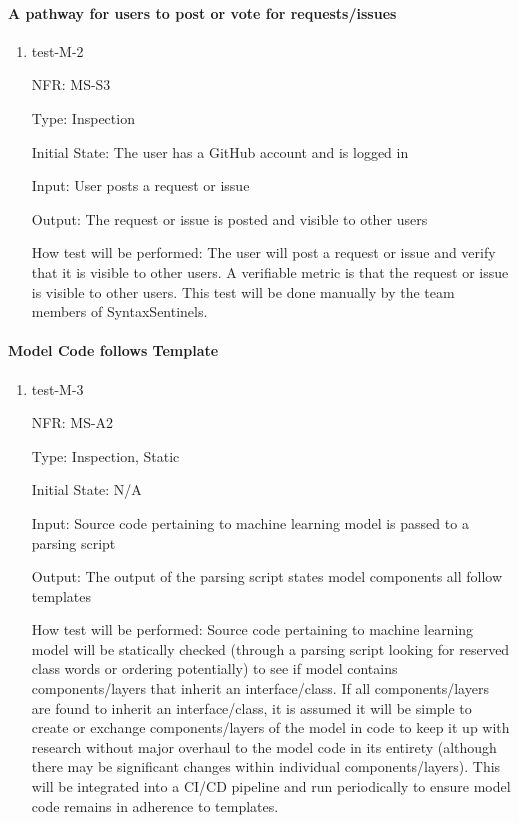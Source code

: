 \documentclass[12pt, titlepage]{article}
\begin{document}
\paragraph{A pathway for users to post or vote for requests/issues}

\begin{enumerate}
  \item{test-M-2}

  NFR: MS-S3

  Type: Inspection

  Initial State: The user has a GitHub account and is logged in

  Input: User posts a request or issue

  Output: The request or issue is posted and visible to other users

  How test will be performed:
  The user will post a request or issue and verify that it is visible to other users. 
  A verifiable metric is that the request or issue is visible to other users.
  This test will be done manually by the team members of SyntaxSentinels.
\end{enumerate}

\paragraph{Model Code follows Template }

\begin{enumerate}
  \item{test-M-3}

  NFR: MS-A2

  Type: Inspection, Static

  Initial State: N/A

  Input: Source code pertaining to machine learning model is passed to a parsing script

  Output: The output of the parsing script states model components all follow templates

  How test will be performed:
  Source code pertaining to machine learning model will be statically checked
(through a parsing script looking for reserved class words or ordering potentially) 
to see if model contains components/layers that inherit an interface/class. If all 
components/layers are found to inherit an interface/class, it is assumed it will be simple 
to create or exchange components/layers of the model in code to keep it up with research 
without major overhaul to the model code in its entirety (although there may be significant
changes within individual components/layers). This will be integrated into a CI/CD pipeline and run
periodically to ensure model code remains in adherence to templates.
\end{enumerate}
\end{document}

